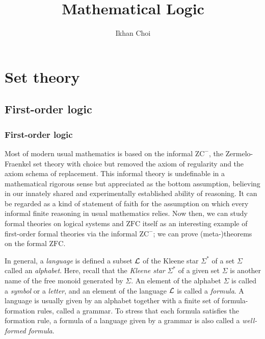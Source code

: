 \documentclass{../../large}
\begin{document}
\title{Mathematical Logic}
\author{Ikhan Choi}
\maketitle
\tableofcontents


\part{Set theory}
\chapter{First-order logic}
\section{First-order logic}
\begin{prb}
Most of modern usual mathematics is based on the informal $\mathrm{ZC}^-$, the Zermelo-Fraenkel set theory with choice but removed the axiom of regularity and the axiom schema of replacement.
This informal theory is undefinable in a mathematical rigorous sense but appreciated as the bottom assumption, believing in our innately shared and experimentally established ability of reasoning.
It can be regarded as a kind of statement of faith for the assumption on which every informal finite reasoning in usual mathematics relies.
Now then, we can study formal theories on logical systems and $\mathrm{ZFC}$ itself as an interesting example of first-order formal theories via the informal $\mathrm{ZC^-}$; we can prove (meta-)theorems on the formal $\mathrm{ZFC}$.
\end{prb}

\begin{prb}[Languages]
In general, a \emph{language} is defined a subset $\mathcal{L}$ of the Kleene star $\Sigma^*$ of a set $\Sigma$ called an \emph{alphabet}.
Here, recall that the \emph{Kleene star} $\Sigma^*$ of a given set $\Sigma$ is another name of the free monoid generated by $\Sigma$.
An element of the alphabet $\Sigma$ is called a \emph{symbol} or a \emph{letter}, and an element of the language $\mathcal{L}$ is called a \emph{formula}.
A language is usually given by an alphabet together with a finite set of formula-formation rules, called a grammar.
To stress that each formula satisfies the formation rule, a formula of a language given by a grammar is also called a \emph{well-formed formula}.
\end{prb}
\end{document}
